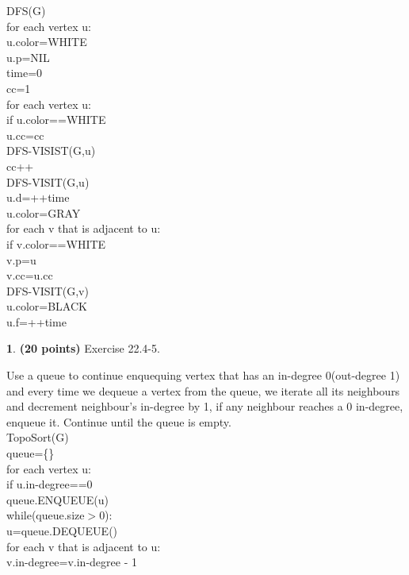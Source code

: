 \documentclass[11pt]{article}
\theoremstyle{definition}
\theoremstyle{theorem}
\newtheorem{prob}{}
\newcommand{\solution}{\medskip\noindent{\color{DarkBlue}\textbf{Solution:}}}
\begin{document}
DFS(G)\\
\null\qquad for each vertex u:\\
\null\qquad\qquad u.color=WHITE\\
\null\qquad\qquad u.p=NIL\\
\null\qquad time=0\\
\null\qquad cc=1\\
\null\qquad for each vertex u:\\
\null\qquad\qquad if u.color==WHITE\\
\null\qquad\qquad\qquad u.cc=cc\\
\null\qquad\qquad\qquad DFS-VISIST(G,u)\\
\null\qquad\qquad\qquad cc++\\
DFS-VISIT(G,u)\\
\null\qquad u.d=++time\\
\null\qquad u.color=GRAY\\
\null\qquad for each v that is adjacent to u:\\
\null\qquad\qquad if v.color==WHITE\\
\null\qquad\qquad\qquad v.p=u\\
\null\qquad\qquad\qquad v.cc=u.cc\\
\null\qquad\qquad\qquad DFS-VISIT(G,v)\\
\null\qquad u.color=BLACK\\
\null\qquad u.f=++time
\begin{prob} \textbf{(20 points)} Exercise 22.4-5.
\end{prob}
\solution
Use a queue to continue enquequing vertex that has an in-degree 0(out-degree 1) and every time we dequeue a vertex from the queue, we iterate all its neighbours and decrement neighbour's in-degree by 1, if any neighbour reaches a 0 in-degree, enqueue it. Continue until the queue is empty.\\ 
TopoSort(G)\\
\null\qquad queue=\{\}\\
\null\qquad for each vertex u:\\
\null\qquad\qquad if u.in-degree==0\\
\null\qquad\qquad\qquad queue.ENQUEUE(u)\\
\null\qquad while(queue.size$>$0):\\
\null\qquad\qquad u=queue.DEQUEUE()\\
\null\qquad\qquad for each v that is adjacent to u:\\
\null\qquad\qquad\qquad v.in-degree=v.in-degree - 1\\
\end{document}
